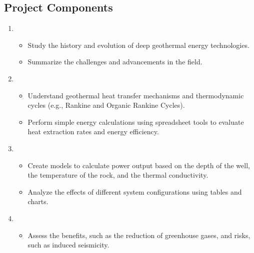 \documentclass[letterpaper,10pt,english]{jupyterBook}
\begin{document}
\subsection{Project Components}
\label{\detokenize{ProjectInstructions:id37}}\begin{enumerate}
%
\item {} 
\sphinxAtStartPar
{}
\begin{itemize}
\item {} 
\sphinxAtStartPar
Study the history and evolution of deep geothermal energy technologies.

\item {} 
\sphinxAtStartPar
Summarize the challenges and advancements in the field.

\end{itemize}

\item {} 
\sphinxAtStartPar
{}
\begin{itemize}
\item {} 
\sphinxAtStartPar
Understand geothermal heat transfer mechanisms and thermodynamic cycles (e.g., Rankine and Organic Rankine Cycles).

\item {} 
\sphinxAtStartPar
Perform simple energy calculations using spreadsheet tools to evaluate heat extraction rates and energy efficiency.

\end{itemize}

\item {} 
\sphinxAtStartPar
{}
\begin{itemize}
\item {} 
\sphinxAtStartPar
Create models to calculate power output based on the depth of the well, the temperature of the rock, and the thermal conductivity.

\item {} 
\sphinxAtStartPar
Analyze the effects of different system configurations using tables and charts.

\end{itemize}

\item {} 
\sphinxAtStartPar
{}
\begin{itemize}
\item {} 
\sphinxAtStartPar
Assess the benefits, such as the reduction of greenhouse gases, and risks, such as induced seismicity.


\end{itemize}
\end{enumerate}
\end{document}
